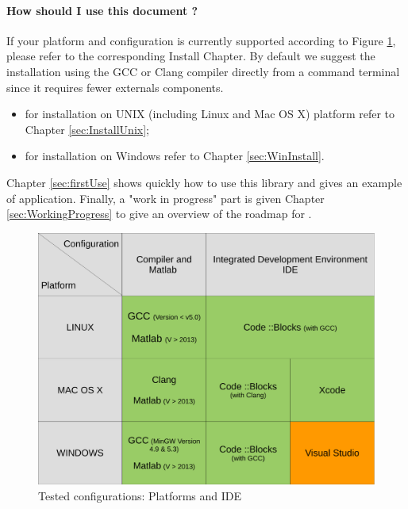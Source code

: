 \paragraph{How should I use this document ?}
If your platform and configuration is currently supported according to Figure \ref{fig:recapInstall}, please refer to the corresponding Install Chapter. By default we suggest the installation using the GCC or Clang compiler directly from a command terminal since it requires fewer externals components. 
\begin{itemize}
\item for installation on UNIX (including Linux and Mac OS X) platform refer to Chapter \ref{sec:InstallUnix};
\item for installation on Windows refer to Chapter \ref{sec:WinInstall}. 
\end{itemize}
Chapter \ref{sec:firstUse} shows quickly how to use this library and gives an example of application. Finally, a "work in progress" part is given Chapter \ref{sec:WorkingProgress} to give an overview of the roadmap for \FAuST. 

\begin{figure}[H] %
\centering
\includegraphics[scale=0.4]{images/recapInstall.pdf}
\caption{Tested configurations: Platforms and IDE}
\label{fig:recapInstall}
\end{figure}

